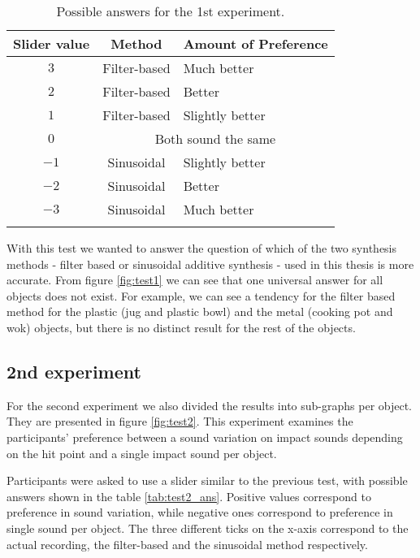 \begin{table}[H]
	\centering
    \begin{tabular}{ c  c  l  }
    \toprule
    \textbf{Slider value} & \textbf{Method} & \textbf{Amount of Preference} \\ \toprule
    \addlinespace
    $3$ & Filter-based & Much better  \\
    $2$ & Filter-based & Better \\
    $1$ & Filter-based & Slightly better \\ 
    \addlinespace
    $0$ & \multicolumn{2}{c}{Both sound the same} \\
    \addlinespace
    $-1$ & Sinusoidal & Slightly better \\ 
    $-2$ & Sinusoidal & Better \\ 
    $-3$ & Sinusoidal & Much better \\
    \addlinespace
    \bottomrule
    \end{tabular}
    \caption{Possible answers for the 1st experiment.}
    \label{tab:test1_ans}
\end{table}  

With this test we wanted to answer the question of which of the two synthesis methods - filter based or sinusoidal additive synthesis - used in this thesis is more accurate. From figure \ref{fig:test1} we can see that one universal answer for all objects does not exist. For example, we can see a tendency for the filter based method for the plastic (jug and plastic bowl) and the metal (cooking pot and wok) objects, but there is no distinct result for the rest of the objects.


\subsection{2nd experiment}
For the second experiment we also divided the results into sub-graphs per object. They are presented in figure \ref{fig:test2}. This experiment examines the participants' preference between a sound variation on impact sounds depending on the hit point and a single impact sound per object.

Participants were asked to use a slider similar to the previous test, with possible answers shown in the table \ref{tab:test2_ans}. Positive values correspond to preference in sound variation, while negative ones correspond to preference in single sound per object. The three different ticks on the x-axis correspond to the actual recording, the filter-based and the sinusoidal method respectively. %

